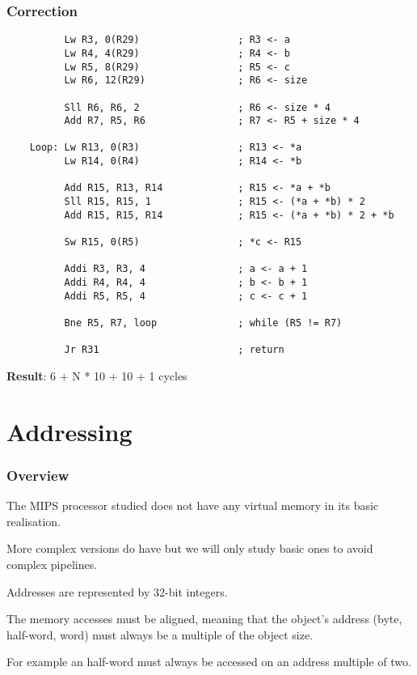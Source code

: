 \begin{frame}[containsverbatim]
  \frametitle{Correction}

  \begin{verbatim}
          Lw R3, 0(R29)                 ; R3 <- a
          Lw R4, 4(R29)                 ; R4 <- b
          Lw R5, 8(R29)                 ; R5 <- c
          Lw R6, 12(R29)                ; R6 <- size

          Sll R6, R6, 2                 ; R6 <- size * 4
          Add R7, R5, R6                ; R7 <- R5 + size * 4

    Loop: Lw R13, 0(R3)                 ; R13 <- *a
          Lw R14, 0(R4)                 ; R14 <- *b

          Add R15, R13, R14             ; R15 <- *a + *b
          Sll R15, R15, 1               ; R15 <- (*a + *b) * 2
          Add R15, R15, R14             ; R15 <- (*a + *b) * 2 + *b

          Sw R15, 0(R5)                 ; *c <- R15

          Addi R3, R3, 4                ; a <- a + 1
          Addi R4, R4, 4                ; b <- b + 1
          Addi R5, R5, 4                ; c <- c + 1

          Bne R5, R7, loop              ; while (R5 != R7)

          Jr R31                        ; return
  \end{verbatim}

  \textbf{Result}: 6 + N * 10 + 10 + 1 cycles
\end{frame}

%
%

\section{Addressing}


\begin{frame}
  \frametitle{Overview}

  The MIPS processor studied does not have any virtual memory in its basic
  realisation.

  \nl

  More complex versions do have but we will only study basic ones to
  avoid complex pipelines.

  \nl

  Addresses are represented by 32-bit integers.

  \nl

  The memory accesses must be aligned, meaning that the object's address
  (byte, half-word, word) must always be a multiple of the object size.

  \nl

  For example an half-word must always be accessed on an address multiple
  of two.
\end{frame}

